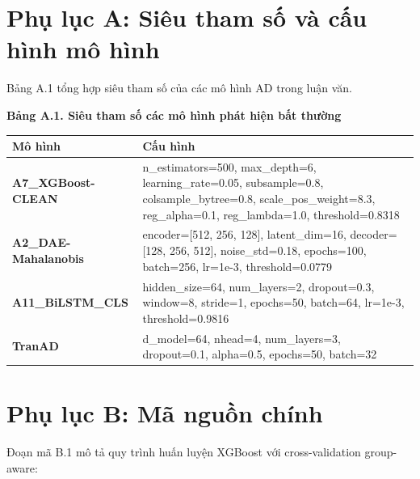 
\section*{Phụ lục A: Siêu tham số và cấu hình mô hình}

Bảng A.1 tổng hợp siêu tham số của các mô hình AD trong luận văn.

\begin{center}
\fontsize{11pt}{14pt}\selectfont
\textbf{Bảng A.1. Siêu tham số các mô hình phát hiện bất thường}
\end{center}
\vspace{-6pt}
\noindent
\fontsize{11pt}{14pt}\selectfont
\begin{tabularx}{\textwidth}{|>{\bfseries}p{3.5cm}|>{\raggedright\arraybackslash}X|}
\hline
\textbf{Mô hình} & \textbf{Cấu hình} \\
\hline
A7\_XGBoost-CLEAN & n\_estimators=500, max\_depth=6, learning\_rate=0.05, subsample=0.8, colsample\_bytree=0.8, scale\_pos\_weight=8.3, reg\_alpha=0.1, reg\_lambda=1.0, threshold=0.8318 \\
\hline
A2\_DAE-Mahalanobis & encoder=[512, 256, 128], latent\_dim=16, decoder=[128, 256, 512], noise\_std=0.18, epochs=100, batch=256, lr=1e-3, threshold=0.0779 \\
\hline
A11\_BiLSTM\_CLS & hidden\_size=64, num\_layers=2, dropout=0.3, window=8, stride=1, epochs=50, batch=64, lr=1e-3, threshold=0.9816 \\
\hline
TranAD & d\_model=64, nhead=4, num\_layers=3, dropout=0.1, alpha=0.5, epochs=50, batch=32 \\
\hline
\end{tabularx}

\section*{Phụ lục B: Mã nguồn chính}

Đoạn mã B.1 mô tả quy trình huấn luyện XGBoost với cross-validation group-aware:

